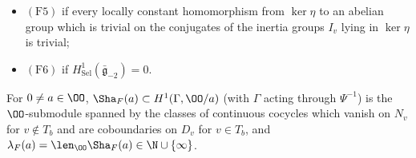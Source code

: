 \begin{definition}
\begin{itemize}
  vanishes on $N_v$ ($v\notin T_b$), on $I_v$ ($v\in T_b$) if $j=0$, and, if $j<0$, agrees with a coboundary on $D_{v_\ell}\cap\ker\eta$,
  becomes a coboundary after multiplication by some $0\ne a\in\OO$;
\item $(\mathrm{F5})$ if every locally constant homomorphism from $\ker\eta$ to an abelian group which is trivial on the conjugates of the
  inertia groups $I_v$ lying in $\ker\eta$ is trivial;
\item $(\mathrm{F6})$ if $H^1_{\mathrm{Sel}}(\bar{\mathfrak g}_{-2})=0$.
\end{itemize}
For $0\ne a\in\OO$, $\Sha_F(a)\subset H^1(\Gamma,\OO/a)$ (with $\Gamma$ acting through $\Psi^{-1}$) is the $\OO$-submodule spanned by the classes
of continuous cocycles which vanish on $N_v$ for $v\notin T_b$ and are coboundaries on $D_v$ for $v\in T_b$, and
$\lambda_F(a)=\len_\OO\Sha_F(a)\in\N\cup\{\infty\}$.
\end{definition}

